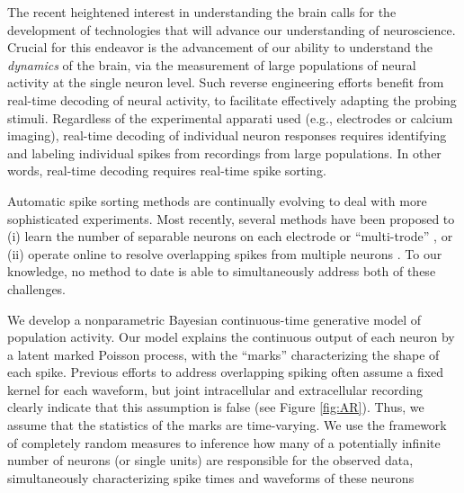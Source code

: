 
The recent heightened interest in understanding the brain calls for the development of technologies that will advance our understanding of neuroscience. %
Crucial for this endeavor is the advancement of our ability to understand the \emph{dynamics} of the brain, via the measurement of large populations of 
neural activity at the single neuron level.  Such reverse engineering efforts  benefit from real-time decoding of neural activity, to 
facilitate effectively adapting the probing stimuli. 
Regardless of the experimental apparati used (e.g., electrodes or calcium imaging), real-time decoding of individual neuron responses requires identifying and labeling individual spikes from recordings from large populations.
In other words, real-time decoding requires real-time spike sorting.

Automatic spike sorting methods are continually evolving to deal with more sophisticated experiments.  Most recently, several methods have been proposed to (i) learn the number of separable neurons on each electrode or ``multi-trode'' \cite{Pillow2013,Prentice2011}, or (ii) operate online to resolve overlapping spikes from multiple neurons \cite{Franke2010}.   To our knowledge, no method to date is able to simultaneously address both of these challenges.  

We develop a nonparametric Bayesian continuous-time generative model of population activity.  Our model explains the continuous output of each neuron
by a latent marked Poisson process, with the ``marks'' characterizing the shape of each spike.  Previous efforts to address overlapping spiking often assume a fixed kernel for each waveform, but joint intracellular and extracellular recording clearly indicate that this assumption is false (see Figure \ref{fig:AR}). Thus, we assume that the statistics of the marks are time-varying.  
We use the framework of completely random measures to inference how many of a potentially infinite number of neurons (or single units)
are responsible for the observed data,  simultaneously characterizing spike times and waveforms of these neurons

